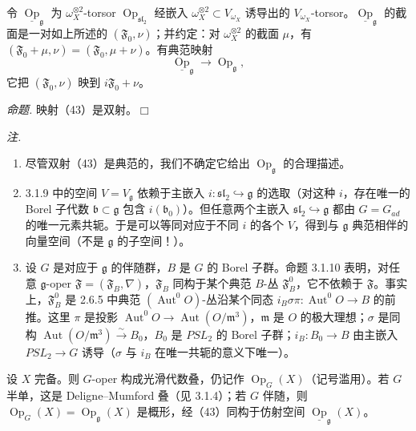 令 $\underline{\operatorname{Op}}_{\mathfrak{g}}$ 为 $\omega_X^{\otimes 2}$-torsor $\operatorname{Op}_{\mathfrak{sl}_2}$ 经嵌入 $\omega_X^{\otimes 2} \subset V_{\omega_X}$ 诱导出的 $V_{\omega_X}$-torsor。$\underline{\operatorname{Op}}_{\mathfrak{g}}$ 的截面是一对如上所述的 $(\mathfrak{F}_0,\nu)$；并约定：对 $\omega_X^{\otimes 2}$ 的截面 $\mu$，有 $(\mathfrak{F}_0+\mu,\nu) = (\mathfrak{F}_0,\mu+\nu)$。有典范映射
\begin{equation}\tag{43}
\underline{\operatorname{Op}}_{\mathfrak{g}} \longrightarrow \operatorname{Op}_{\mathfrak{g}},
\end{equation}
它把 $(\mathfrak{F}_0,\nu)$ 映到 $i\mathfrak{F}_0+\nu$。

 \emph{命题.} 映射（43）是双射。\hfill$\Box$

\emph{注.}
\begin{enumerate}[label=(\roman*),leftmargin=2.2em]
\item 尽管双射（43）是典范的，我们不确定它给出 $\operatorname{Op}_{\mathfrak{g}}$ 的合理描述。
\item 3.1.9 中的空间 $V = V_{\mathfrak{g}}$ 依赖于主嵌入 $i: \mathfrak{sl}_2 \hookrightarrow \mathfrak{g}$ 的选取（对这种 $i$，存在唯一的 Borel 子代数 $\mathfrak{b} \subset \mathfrak{g}$ 包含 $i(\mathfrak{b}_0)$）。但任意两个主嵌入 $\mathfrak{sl}_2 \hookrightarrow \mathfrak{g}$ 都由 $G = G_{ad}$ 的唯一元素共轭。于是可以等同对应于不同 $i$ 的各个 $V$，得到与 $\mathfrak{g}$ 典范相伴的向量空间（不是 $\mathfrak{g}$ 的子空间！）。
\item 设 $G$ 是对应于 $\mathfrak{g}$ 的伴随群，$B$ 是 $G$ 的 Borel 子群。命题 3.1.10 表明，对任意 $\mathfrak{g}$-oper $\mathfrak{F} = (\mathfrak{F}_B,\nabla)$，$\mathfrak{F}_B$ 同构于某个典范 $B$-丛 $\mathfrak{F}_B^0$，它不依赖于 $\mathfrak{F}$。事实上，$\mathfrak{F}_B^0$ 是 2.6.5 中典范 $(\operatorname{Aut}^0 O)$-丛沿某个同态 $i_B\sigma\pi: \operatorname{Aut}^0 O \to B$ 的前推。这里 $\pi$ 是投影 $\operatorname{Aut}^0 O \to \operatorname{Aut}(O/\mathfrak{m}^3)$，$\mathfrak{m}$ 是 $O$ 的极大理想；$\sigma$ 是同构 $\operatorname{Aut}(O/\mathfrak{m}^3) \xrightarrow{\sim} B_0$，$B_0$ 是 $PSL_2$ 的 Borel 子群；$i_B: B_0 \to B$ 由主嵌入 $PSL_2 \to G$ 诱导（$\sigma$ 与 $i_B$ 在唯一共轭的意义下唯一）。
\end{enumerate}

 设 $X$ 完备。则 $G$-oper 构成光滑代数叠，仍记作 $\operatorname{Op}_G(X)$（记号滥用）。若 $G$ 半单，这是 Deligne--Mumford 叠（见 3.1.4）；若 $G$ 伴随，则 $\operatorname{Op}_G(X) = \operatorname{Op}_{\mathfrak{g}}(X)$ 是概形，经（43）同构于仿射空间 $\underline{\operatorname{Op}}_{\mathfrak{g}}(X)$。


